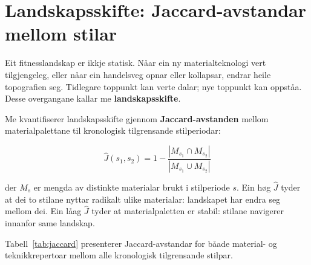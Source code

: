 \documentclass[10pt, a4paper, twocolumn]{article}
\begin{document}
\section{Landskapsskifte: Jaccard-avstandar mellom stilar}

Eit fitnesslandskap er ikkje statisk. N\r{a}ar ein ny materialteknologi vert tilgjengeleg, eller n\r{a}ar ein handelsveg opnar eller kollapsar, endrar heile topografien seg. Tidlegare toppunkt kan verte dalar; nye toppunkt kan oppst\r{a}a. Desse overgangane kallar me \textbf{landskapsskifte}.

Me kvantifiserer landskapsskifte gjennom \textbf{Jaccard-avstanden} \citep{magurran2004} mellom materialpalettane til kronologisk tilgrensande stilperiodar:

\begin{equation}
  \hat{J}(s_1, s_2) = 1 - \frac{|M_{s_1} \cap M_{s_2}|}{|M_{s_1} \cup M_{s_2}|}
\end{equation}

\noindent der $M_{s}$ er mengda av distinkte materialar brukt i stilperiode $s$. Ein h\o g $\hat{J}$ tyder at dei to stilane nyttar radikalt ulike materialar: landskapet har endra seg mellom dei. Ein l\r{a}ag $\hat{J}$ tyder at materialpaletten er stabil: stilane navigerer innanfor same landskap.

Tabell~\ref{tab:jaccard} presenterer Jaccard-avstandar for b\r{a}ade material- og teknikkrepertoar mellom alle kronologisk tilgrensande stilpar.
\end{document}
